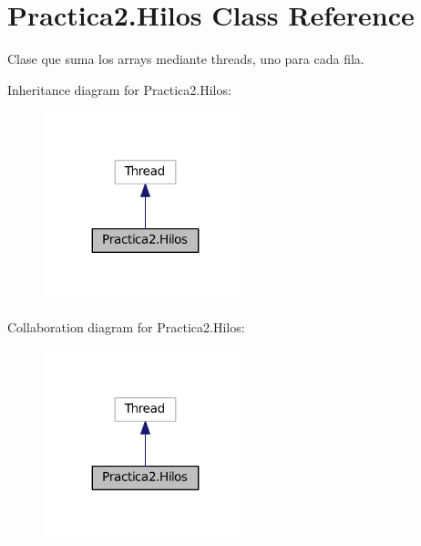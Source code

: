 \hypertarget{class_practica2_1_1_hilos}{}\section{Practica2.\+Hilos Class Reference}
\label{class_practica2_1_1_hilos}


Clase que suma los arrays mediante threads, uno para cada fila.  




Inheritance diagram for Practica2.\+Hilos\+:
\nopagebreak
\begin{figure}[H]
\begin{center}
\leavevmode
\includegraphics[width=167pt]{class_practica2_1_1_hilos__inherit__graph}
\end{center}
\end{figure}


Collaboration diagram for Practica2.\+Hilos\+:
\nopagebreak
\begin{figure}[H]
\begin{center}
\leavevmode
\includegraphics[width=167pt]{class_practica2_1_1_hilos__coll__graph}
\end{center}
\end{figure}
